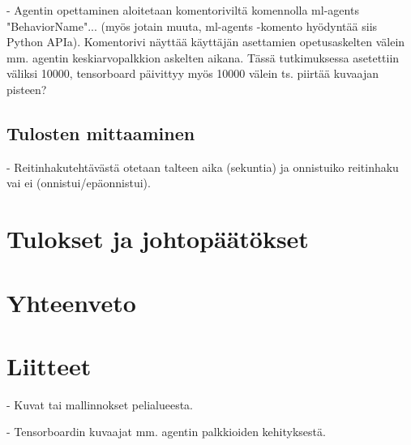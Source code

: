 \documentclass[utf8]{gradu3}
\begin{document}
- Agentin opettaminen aloitetaan komentoriviltä komennolla ml-agents "BehaviorName"... (myös jotain muuta, ml-agents -komento hyödyntää siis Python APIa). Komentorivi näyttää käyttäjän asettamien opetusaskelten välein mm. agentin keskiarvopalkkion askelten aikana. Tässä tutkimuksessa asetettiin väliksi 10000, tensorboard päivittyy myös 10000 välein ts. piirtää kuvaajan pisteen?

\section{Tulosten mittaaminen}
\label{sec:mittaaminen}

- Reitinhakutehtävästä otetaan talteen aika (sekuntia) ja onnistuiko reitinhaku vai ei (onnistui/epäonnistui).

\chapter{Tulokset ja johtopäätökset}

\chapter{Yhteenveto}

\printbibliography

\chapter{Liitteet}

- Kuvat tai mallinnokset pelialueesta.

- Tensorboardin kuvaajat mm. agentin palkkioiden kehityksestä.
\end{document}
